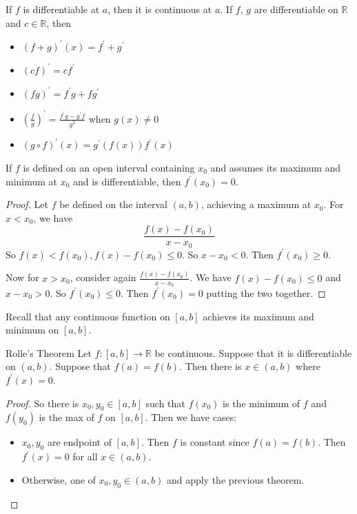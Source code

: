 \documentclass{report}
\begin{document}
If $f$ is differentiable at $a$, then it is continuous at $a$. If $f$, $g$ are differentiable on $\mathbb{R}$ and $c \in \mathbb{R}$, then 
    \begin{itemize}
        \item  $(f + g)^{\prime}(x) = f^{\prime} + g^{\prime}$

        \item  $(cf)^{\prime} = cf^{\prime}$

        \item  $(fg)^{\prime} = f^{\prime}g + fg^{\prime}$

        \item $(\frac{f}{g})^{\prime} = \frac{f^{\prime}g - g^{\prime}f}{g^{2}}$ when $g(x) \neq 0$

        \item $(g \circ f)^{\prime}(x) = g^{\prime}(f(x))f^{\prime}(x)$ 
    \end{itemize}   

\begin{theorem}{29.1}
    If $f$ is defined on an open interval containing $x_{0}$ and assumes its maximum and minimum at $x_{0}$ and is differentiable, then $f^{\prime}(x_{0}) = 0$.
\end{theorem}
    \begin{proof}
        Let $f$ be defined on the interval $(a, b)$, achieving a maximum at $x_{0}$. For $x < x_{0}$, we have
            \begin{equation*}
                \dfrac{f(x) - f(x_{0})}{x - x_{0}}
            \end{equation*}
        So $f(x) < f(x_{0}), f(x) - f(x_{0}) \leq 0$. So $x - x_{0} < 0$. Then $f^{\prime}(x_{0}) \geq 0$. 

        Now for $x > x_{0}$, consider again $\frac{f(x) - f(x_{0})}{x - x_{0}}$. We have $f(x) - f(x_{0}) \leq 0$ and $x - x_{0} > 0$. So $f^{\prime}(x_{0}) \leq 0$. Then $f^{\prime}(x_{0}) = 0$ putting the two together.
    \end{proof}

Recall that any continuous function on $[a, b]$ achieves its maximum and minimum on $[a, b]$.

\begin{theorem}{Rolle's Theorem}
    Let $f : [a, b] \rightarrow \mathbb{R}$ be continuous. Suppose that it is differentiable on $(a, b)$. Suppose that $f(a) = f(b)$. Then there is $x \in (a, b)$ where $f^{\prime}(x) = 0$.
\end{theorem}
    \begin{proof}
        So there is $x_{0}, y_{0} \in [a, b]$ such that $f(x_{0})$ is the minimum of $f$ and $f(y_{0})$ is the max of $f$ on $[a, b]$. Then we have cases:
            \begin{itemize}
                \item $x_{0}, y_{0}$ are endpoint of $[a, b]$. Then $f$ is constant since $f(a) = f(b)$. Then $f^{\prime}(x) = 0$ for all $x \in (a, b)$.

                \item Otherwise, one of $x_{0}, y_{0} \in (a, b)$ and apply the previous theorem. 
            \end{itemize}
    \end{proof}
\end{document}
